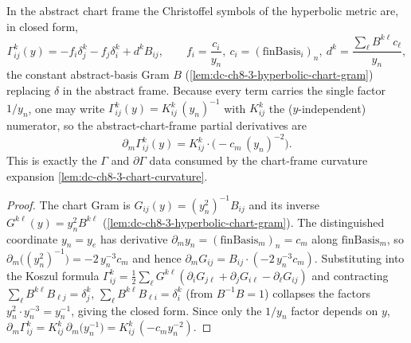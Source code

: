 \begin{lemma}
  \label{lem:dc-ch8-3-hyperbolic-christoffel}


  In the abstract chart frame the Christoffel symbols of the hyperbolic metric are,
  in closed form,
  $$\Gamma^k_{ij}(y)=-f_i\delta^k_j-f_j\delta^k_i+d^k B_{ij},\qquad
    f_i=\frac{c_i}{y_n},\ c_i=(\text{finBasis}_i)_n,\ d^k=\frac{\sum_\ell B^{k\ell}c_\ell}{y_n},$$
  the constant abstract-basis Gram $B$ (\cref{lem:dc-ch8-3-hyperbolic-chart-gram})
  replacing $\delta$ in the abstract frame.
  Because every term carries the single factor $1/y_n$, one may write
  $\Gamma^k_{ij}(y)=K^k_{ij}\,(y_n)^{-1}$ with $K^k_{ij}$ the ($y$-independent)
  numerator, so the abstract-chart-frame partial derivatives are
  $$\partial_m\Gamma^k_{ij}(y)=K^k_{ij}\cdot\bigl(-c_m\,(y_n)^{-2}\bigr).$$
  This is exactly the $\Gamma$ and $\partial\Gamma$ data consumed by the chart-frame
  curvature expansion \cref{lem:dc-ch8-3-chart-curvature}.
\end{lemma}
\begin{proof}

\sketch
  The chart Gram is $G_{ij}(y)=(y_n^2)^{-1}B_{ij}$ and its inverse
  $G^{k\ell}(y)=y_n^2 B^{k\ell}$ (\cref{lem:dc-ch8-3-hyperbolic-chart-gram}). The
  distinguished coordinate $y_n=y_e$ has derivative
  $\partial_m y_n=(\text{finBasis}_m)_n=c_m$ along $\text{finBasis}_m$, so
  $\partial_m\bigl((y_n^2)^{-1}\bigr)=-2\,y_n^{-3}c_m$ and hence
  $\partial_m G_{ij}=B_{ij}\cdot(-2\,y_n^{-3}c_m)$. Substituting into the Koszul
  formula
  $\Gamma^k_{ij}=\tfrac12\sum_\ell G^{k\ell}(\partial_iG_{j\ell}+\partial_jG_{i\ell}-\partial_\ell G_{ij})$
  and contracting $\sum_\ell B^{k\ell}B_{\ell j}=\delta^k_j$,
  $\sum_\ell B^{k\ell}B_{\ell i}=\delta^k_i$ (from $B^{-1}B=1$) collapses the factors
  $y_n^2\cdot y_n^{-3}=y_n^{-1}$, giving the closed form. Since only the $1/y_n$ factor
  depends on $y$, $\partial_m\Gamma^k_{ij}=K^k_{ij}\,\partial_m\bigl(y_n^{-1}\bigr)
  =K^k_{ij}\,(-c_m y_n^{-2})$.
\end{proof}

